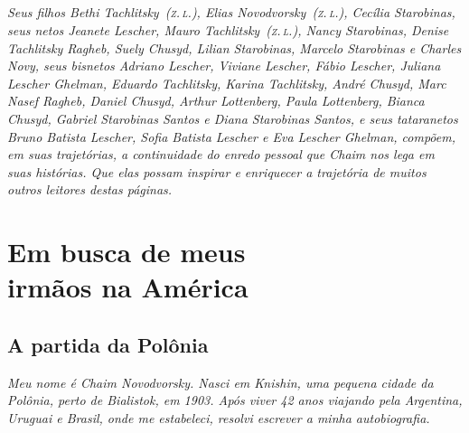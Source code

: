 \chapter*{}
\thispagestyle{empty}

\vfill
\begin{flushright}
\small
\textit{Seus filhos Bethi Tachlitsky~(\textsc{z.\,l.}), Elias Novodvorsky~(\textsc{z.\,l.}), Cecília Starobinas, seus netos Jeanete Lescher, Mauro Tachlitsky~(\textsc{z.\,l.}), Nancy Starobinas, Denise Tachlitsky Ragheb, Suely Chusyd, Lilian Starobinas, Marcelo Starobinas e Charles Novy, seus bisnetos Adriano Lescher, Viviane Lescher, Fábio Lescher, Juliana Lescher Ghelman, Eduardo Tachlitsky, Karina Tachlitsky, André Chusyd, Marc Nasef Ragheb, Daniel Chusyd, Arthur Lottenberg, Paula Lottenberg, Bianca Chusyd, Gabriel Starobinas Santos e Diana Starobinas Santos, e seus tataranetos Bruno Batista Lescher, Sofia Batista Lescher e Eva Lescher Ghelman, compõem, em suas trajetórias, a continuidade do enredo pessoal que Chaim nos lega em suas histórias. Que elas possam inspirar e enriquecer a trajetória de muitos outros leitores destas páginas.} 
\end{flushright}


\part[Em busca de meus irmãos na América]{Em busca de meus\\irmãos na América}
\openany
\chapter{A partida da Polônia}

\textit{Meu nome é Chaim Novodvorsky. Nasci em Knishin, uma pequena cidade da
Polônia, perto de Bialistok, em 1903. Após viver 42 anos viajando pela
Argentina, Uruguai e Brasil, onde me estabeleci, resolvi escrever a minha
autobiografia.}

\begin{center}
\end{center}

